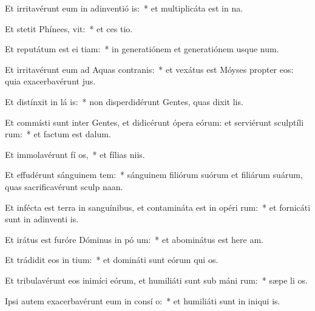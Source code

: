 \item Et irritavérunt eum in adinventió is:~* et multiplicáta est in  na.
\item Et stetit Phínees,  vit:~* et ces tio.
\item Et reputátum est ei  tiam:~* in generatiónem et generatiónem usque  num.
\item Et irritavérunt eum ad Aquas contranis:~* et vexátus est Móyses propter eos: quia exacerbavérunt  jus.
\item Et distínxit in lá is:~* non disperdidérunt Gentes, quas dixit  lis.
\item Et commísti sunt inter Gentes, et didicérunt ópera eórum: et serviérunt sculptíli rum:~* et factum est   dalum.
\item Et immolavérunt fí os,~* et fílias  niis.
\item Et effudérunt sánguinem tem:~* sánguinem filiórum suórum et filiárum suárum, quas sacrificavérunt sculp naan.
\item Et infécta est terra in sanguínibus, et contamináta est in opéri rum:~* et fornicáti sunt in adinventi is.
\item Et irátus est furóre Dóminus in pó um:~* et abominátus est here am.
\item Et trádidit eos in  tium:~* et domináti sunt eórum qui  os.
\item Et tribulavérunt eos inimíci eórum, et humiliáti sunt sub máni rum:~* sæpe li os.
\item Ipsi autem exacerbavérunt eum in consí o:~* et humiliáti sunt in iniqui is.
